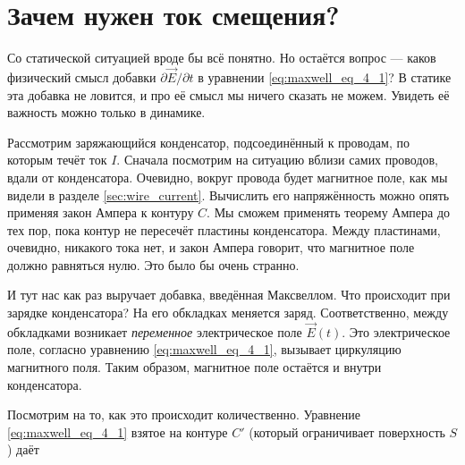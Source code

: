 \documentclass[a4paper,12pt]{article}
\numberwithin{equation}{section}
\newcommand{\pt}{\partial}
\begin{document}
\section{Зачем нужен ток смещения?}
\label{sec:displacement_current}

Со статической ситуацией вроде бы всё понятно. Но остаётся вопрос ---
каков физический смысл добавки $\pt \vec{E} / \pt t$ в уравнении
\eqref{eq:maxwell_eq_4_1}? В статике эта добавка не ловится, и про её
смысл мы ничего сказать не можем. Увидеть её важность можно только в
динамике. 

\begin{figure}[h]
  \centering
  \label{fig:displacement}
\end{figure}

Рассмотрим заряжающийся конденсатор, подсоединённый к проводам, по
которым течёт ток $I$. Сначала посмотрим на ситуацию вблизи самих
проводов, вдали от конденсатора. Очевидно, вокруг провода будет
магнитное поле, как мы видели в разделе
\ref{sec:wire_current}. Вычислить его напряжённость можно опять
применяя закон Ампера к контуру $C$. Мы сможем применять теорему
Ампера до тех пор, пока контур не пересечёт пластины
конденсатора. Между пластинами, очевидно, никакого тока нет, и закон
Ампера говорит, что магнитное поле должно равняться нулю. Это было бы
очень странно.

И тут нас как раз выручает добавка, введённая
Максвеллом. Что происходит при зарядке конденсатора? На его обкладках
меняется заряд. Соответственно, между обкладками возникает
\textit{переменное} электрическое поле $\vec{E}(t)$. Это электрическое
поле, согласно уравнению \eqref{eq:maxwell_eq_4_1}, вызывает
циркуляцию магнитного поля. Таким образом, магнитное поле остаётся и
внутри конденсатора. 

Посмотрим на то, как это происходит количественно. Уравнение
\eqref{eq:maxwell_eq_4_1} взятое на контуре $C'$ (который ограничивает
поверхность $S$) даёт
\end{document}
